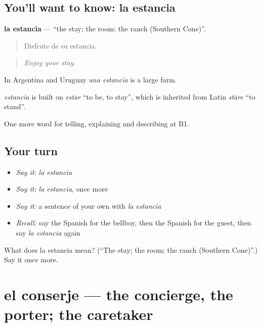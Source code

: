 \subsection*{You'll want to know: la estancia}
\textbf{la estancia} — \textquotedblleft{}the stay; the room; the ranch (Southern Cone)\textquotedblright{}.

\begin{quote}
Disfrute de su estancia.
\end{quote}

\begin{quote}
\emph{Enjoy your stay.}
\end{quote}

In Argentina and Uruguay \emph{una estancia} is a large farm.

\begin{cousinweb}
\emph{estancia} is built on \emph{estar} \textquotedblleft{}to be, to stay\textquotedblright{}, which is inherited from Latin \emph{stāre} \textquotedblleft{}to stand\textquotedblright{}.
\end{cousinweb}

\begin{grammarlens}[title={What you've built}]
One more word for telling, explaining and describing at B1.
\end{grammarlens}

\subsection*{Your turn}
\begin{itemize}
\raggedright
  \item \emph{Say it:} \emph{la estancia}
  \item \emph{Say it:} \emph{la estancia}, once more
  \item \emph{Say it:} a sentence of your own with \emph{la estancia}
  \item \emph{Recall:} say the Spanish for the bellboy, then the Spanish for the guest, then say \emph{la estancia} again
\end{itemize}

\begin{tcolorbox}[breakable,colback=teal!4,colframe=teal!35!black,title={Before you move on}]
What does la estancia mean? (\textquotedblleft{}The stay; the room; the ranch (Southern Cone)\textquotedblright{}.) Say it once more.
\end{tcolorbox}
\section[el conserje]{el conserje — the concierge, the porter; the caretaker}

